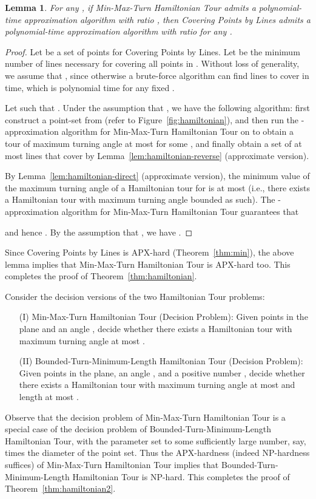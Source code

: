 \documentclass[letterpaper,11pt]{article}
\newtheorem{lemma}{Lemma}
\def\ie{{i.e.}}
\begin{document}
\begin{lemma}\label{lem:hamiltonian}
For any ,
if {\sc Min-Max-Turn Hamiltonian Tour}
admits a polynomial-time approximation algorithm with ratio ,
then {\sc Covering Points by Lines} admits a polynomial-time
approximation algorithm with ratio  for any .
\end{lemma}

\begin{proof}
Let  be a set of  points for {\sc Covering Points by Lines}.
Let  be the minimum number of lines
necessary for covering all points in .
Without loss of generality, we assume that , since otherwise
a brute-force algorithm can find  lines to cover 
in  time, which is polynomial time for any fixed .

Let  such that
.
Under the assumption that , we have the following algorithm:
first construct a point-set  from  (refer to Figure~\ref{fig:hamiltonian}),
and then run the -approximation algorithm for {\sc Min-Max-Turn Hamiltonian Tour}
on  to obtain a tour of maximum turning angle at most
 for some ,
and finally obtain a set  of at most  lines 
that cover  by Lemma~\ref{lem:hamiltonian-reverse} (approximate version).

By Lemma~\ref{lem:hamiltonian-direct} (approximate version),
the minimum value of the maximum turning angle of a Hamiltonian tour
for  is at most 
(\ie, there exists a Hamiltonian tour with maximum turning angle
bounded as such). 
The -approximation algorithm for {\sc Min-Max-Turn Hamiltonian Tour}
guarantees that

and hence
.
By the assumption that ,
we have 
.
\end{proof}

Since {\sc Covering Points by Lines} is APX-hard (Theorem~\ref{thm:min}),
the above lemma implies that {\sc Min-Max-Turn Hamiltonian Tour} is APX-hard too.
This completes the proof of Theorem~\ref{thm:hamiltonian}.

\medskip
Consider the decision versions of the two Hamiltonian Tour problems:
\begin{itemize} \itemsep -1pt
\item[(I)]
{\sc Min-Max-Turn Hamiltonian Tour} (Decision Problem):
Given  points in the plane and an angle ,
decide whether there exists a Hamiltonian tour with maximum turning angle
at most .
\item[(II)]
{\sc Bounded-Turn-Minimum-Length Hamiltonian Tour} (Decision Problem):
Given  points in the plane, an angle ,
and a positive number ,
decide whether there exists a Hamiltonian tour with maximum turning angle
at most  and length at most .
\end{itemize}
Observe that the decision problem of 
{\sc Min-Max-Turn Hamiltonian Tour}
is a special case of the decision problem of
{\sc Bounded-Turn-Minimum-Length Hamiltonian Tour},
with the parameter  set to some sufficiently large number,
say,  times the diameter of the point set.
Thus the APX-hardness (indeed NP-hardness suffices)
of {\sc Min-Max-Turn Hamiltonian Tour}
implies that {\sc Bounded-Turn-Minimum-Length Hamiltonian Tour} is NP-hard.
This completes the proof of Theorem~\ref{thm:hamiltonian2}.
\end{document}
